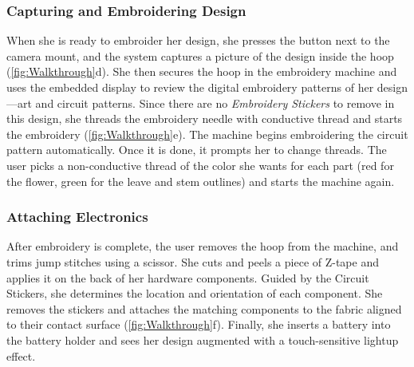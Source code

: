\documentclass{sigchi}
\begin{document}
\subsubsection{Capturing and Embroidering Design}
When she is ready to embroider her design, she presses the button next to the camera mount, and the system captures a picture of the design inside the hoop (\ref{fig:Walkthrough}d). She then secures the hoop in the embroidery machine and uses the embedded display to review the digital embroidery patterns of her design---art and circuit patterns. Since there are no \textit{Embroidery Stickers} to remove in this design, she threads the embroidery needle with conductive thread and starts the embroidery (\ref{fig:Walkthrough}e).  The machine begins embroidering the circuit pattern automatically. Once it is done, it prompts her to change threads. The user picks a non-conductive thread of the color she wants for each part (red for the flower, green for the leave and stem outlines) and starts the machine again. 



\subsubsection{Attaching Electronics}
After embroidery is complete, the user removes the hoop from the machine, and trims jump stitches using a scissor. She cuts and peels a piece of Z-tape and applies it on the back of her hardware components. Guided by the Circuit Stickers, she determines the location and orientation of each component. She removes the stickers and attaches the matching components to the fabric aligned to their contact surface (\ref{fig:Walkthrough}f). Finally, she inserts a battery into the battery holder and sees her design augmented with a touch-sensitive lightup effect.
\end{document}
